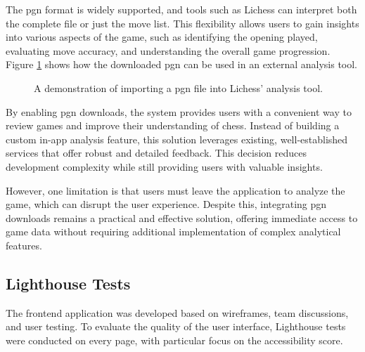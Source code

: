 The \gls{pgn} format is widely supported, and tools such as Lichess can interpret both the complete file or just the move list. This flexibility allows users to gain insights into various aspects of the game, such as identifying the opening played, evaluating move accuracy, and understanding the overall game progression. Figure \ref{fig:downloaded-pgn-analysis} shows how the downloaded \gls{pgn} can be used in an external analysis tool. \\

\begin{figure}[h!] 
    \centering 
    \caption[Lichess' analysis tool]{A demonstration of importing a \gls{pgn} file into Lichess' analysis tool.}
    \label{fig:downloaded-pgn-analysis} 
\end{figure}

By enabling \gls{pgn} downloads, the system provides users with a convenient way to review games and improve their understanding of chess. Instead of building a custom in-app analysis feature, this solution leverages existing, well-established services that offer robust and detailed feedback. This decision reduces development complexity while still providing users with valuable insights. \\

\newpage

However, one limitation is that users must leave the application to analyze the game, which can disrupt the user experience. Despite this, integrating \gls{pgn} downloads remains a practical and effective solution, offering immediate access to game data without requiring additional implementation of complex analytical features.

\subsection{Lighthouse Tests}
The frontend application was developed based on wireframes, team discussions, and user testing. To evaluate the quality of the user interface, Lighthouse tests were conducted on every page, with particular focus on the accessibility score. \\

